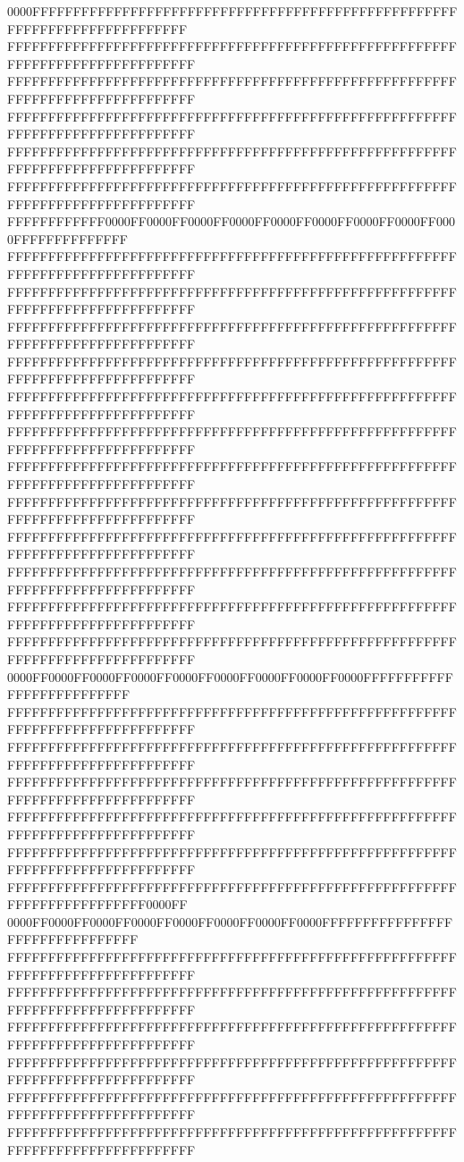 0000FFFFFFFFFFFFFFFFFFFFFFFFFFFFFFFFFFFFFFFFFFFFFFFFFFFFFFFFFFFFFFFFFFFFFFFFFF
FFFFFFFFFFFFFFFFFFFFFFFFFFFFFFFFFFFFFFFFFFFFFFFFFFFFFFFFFFFFFFFFFFFFFFFFFFFFFF
FFFFFFFFFFFFFFFFFFFFFFFFFFFFFFFFFFFFFFFFFFFFFFFFFFFFFFFFFFFFFFFFFFFFFFFFFFFFFF
FFFFFFFFFFFFFFFFFFFFFFFFFFFFFFFFFFFFFFFFFFFFFFFFFFFFFFFFFFFFFFFFFFFFFFFFFFFFFF
FFFFFFFFFFFFFFFFFFFFFFFFFFFFFFFFFFFFFFFFFFFFFFFFFFFFFFFFFFFFFFFFFFFFFFFFFFFFFF
FFFFFFFFFFFFFFFFFFFFFFFFFFFFFFFFFFFFFFFFFFFFFFFFFFFFFFFFFFFFFFFFFFFFFFFFFFFFFF
FFFFFFFFFFFF0000FF0000FF0000FF0000FF0000FF0000FF0000FF0000FF0000FFFFFFFFFFFFFF
FFFFFFFFFFFFFFFFFFFFFFFFFFFFFFFFFFFFFFFFFFFFFFFFFFFFFFFFFFFFFFFFFFFFFFFFFFFFFF
FFFFFFFFFFFFFFFFFFFFFFFFFFFFFFFFFFFFFFFFFFFFFFFFFFFFFFFFFFFFFFFFFFFFFFFFFFFFFF
FFFFFFFFFFFFFFFFFFFFFFFFFFFFFFFFFFFFFFFFFFFFFFFFFFFFFFFFFFFFFFFFFFFFFFFFFFFFFF
FFFFFFFFFFFFFFFFFFFFFFFFFFFFFFFFFFFFFFFFFFFFFFFFFFFFFFFFFFFFFFFFFFFFFFFFFFFFFF
FFFFFFFFFFFFFFFFFFFFFFFFFFFFFFFFFFFFFFFFFFFFFFFFFFFFFFFFFFFFFFFFFFFFFFFFFFFFFF
FFFFFFFFFFFFFFFFFFFFFFFFFFFFFFFFFFFFFFFFFFFFFFFFFFFFFFFFFFFFFFFFFFFFFFFFFFFFFF
FFFFFFFFFFFFFFFFFFFFFFFFFFFFFFFFFFFFFFFFFFFFFFFFFFFFFFFFFFFFFFFFFFFFFFFFFFFFFF
FFFFFFFFFFFFFFFFFFFFFFFFFFFFFFFFFFFFFFFFFFFFFFFFFFFFFFFFFFFFFFFFFFFFFFFFFFFFFF
FFFFFFFFFFFFFFFFFFFFFFFFFFFFFFFFFFFFFFFFFFFFFFFFFFFFFFFFFFFFFFFFFFFFFFFFFFFFFF
FFFFFFFFFFFFFFFFFFFFFFFFFFFFFFFFFFFFFFFFFFFFFFFFFFFFFFFFFFFFFFFFFFFFFFFFFFFFFF
FFFFFFFFFFFFFFFFFFFFFFFFFFFFFFFFFFFFFFFFFFFFFFFFFFFFFFFFFFFFFFFFFFFFFFFFFFFFFF
FFFFFFFFFFFFFFFFFFFFFFFFFFFFFFFFFFFFFFFFFFFFFFFFFFFFFFFFFFFFFFFFFFFFFFFFFFFFFF
0000FF0000FF0000FF0000FF0000FF0000FF0000FF0000FF0000FFFFFFFFFFFFFFFFFFFFFFFFFF
FFFFFFFFFFFFFFFFFFFFFFFFFFFFFFFFFFFFFFFFFFFFFFFFFFFFFFFFFFFFFFFFFFFFFFFFFFFFFF
FFFFFFFFFFFFFFFFFFFFFFFFFFFFFFFFFFFFFFFFFFFFFFFFFFFFFFFFFFFFFFFFFFFFFFFFFFFFFF
FFFFFFFFFFFFFFFFFFFFFFFFFFFFFFFFFFFFFFFFFFFFFFFFFFFFFFFFFFFFFFFFFFFFFFFFFFFFFF
FFFFFFFFFFFFFFFFFFFFFFFFFFFFFFFFFFFFFFFFFFFFFFFFFFFFFFFFFFFFFFFFFFFFFFFFFFFFFF
FFFFFFFFFFFFFFFFFFFFFFFFFFFFFFFFFFFFFFFFFFFFFFFFFFFFFFFFFFFFFFFFFFFFFFFFFFFFFF
FFFFFFFFFFFFFFFFFFFFFFFFFFFFFFFFFFFFFFFFFFFFFFFFFFFFFFFFFFFFFFFFFFFFFFFF0000FF
0000FF0000FF0000FF0000FF0000FF0000FF0000FF0000FFFFFFFFFFFFFFFFFFFFFFFFFFFFFFFF
FFFFFFFFFFFFFFFFFFFFFFFFFFFFFFFFFFFFFFFFFFFFFFFFFFFFFFFFFFFFFFFFFFFFFFFFFFFFFF
FFFFFFFFFFFFFFFFFFFFFFFFFFFFFFFFFFFFFFFFFFFFFFFFFFFFFFFFFFFFFFFFFFFFFFFFFFFFFF
FFFFFFFFFFFFFFFFFFFFFFFFFFFFFFFFFFFFFFFFFFFFFFFFFFFFFFFFFFFFFFFFFFFFFFFFFFFFFF
FFFFFFFFFFFFFFFFFFFFFFFFFFFFFFFFFFFFFFFFFFFFFFFFFFFFFFFFFFFFFFFFFFFFFFFFFFFFFF
FFFFFFFFFFFFFFFFFFFFFFFFFFFFFFFFFFFFFFFFFFFFFFFFFFFFFFFFFFFFFFFFFFFFFFFFFFFFFF
FFFFFFFFFFFFFFFFFFFFFFFFFFFFFFFFFFFFFFFFFFFFFFFFFFFFFFFFFFFFFFFFFFFFFFFFFFFFFF
